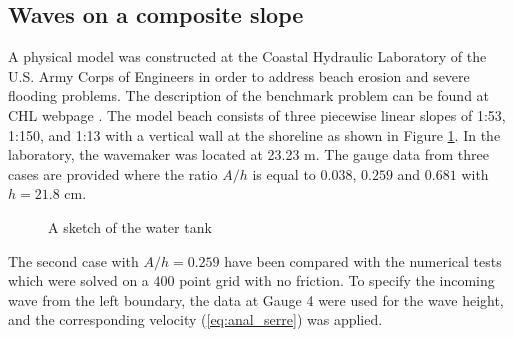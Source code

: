 \documentclass[review]{elsarticle}
\begin{document}
\subsection{Waves on a composite slope}

A physical model was constructed at the Coastal Hydraulic Laboratory of the U.S. Army Corps of Engineers
in order to address beach erosion and severe flooding problems.
The description of the benchmark problem can be found
at CHL webpage \cite{chl_bp5}.
The model beach consists of three piecewise linear slopes of 1:53, 1:150, and 1:13 with a vertical wall at the shoreline as shown in Figure \ref{fig:bp5_water_tank}.
In the laboratory, the wavemaker was located at 23.23 m.
The gauge data from three cases are provided 
where the ratio $A/h$ is equal to $0.038$, $0.259$ and $0.681$
with $h=21.8$ cm.

\begin{figure}[!htb]
\centering
{}
  \caption{A sketch of the water tank}
  \label{fig:bp5_water_tank}
\end{figure}

The second case with $A/h=0.259$ have been 
compared with the numerical tests
which were solved on a $400$ point grid with no friction.
To specify the incoming wave from the left boundary, 
the data at Gauge 4 were used for the wave height,
and the corresponding velocity (\ref{eq:anal_serre})
was applied.
\end{document}
